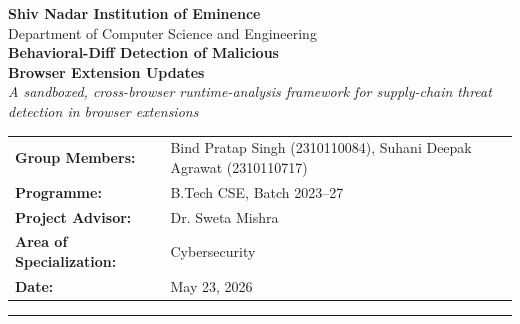 \documentclass[11pt]{article}
\begin{document}
\begin{center}
    {\large\bfseries Shiv Nadar Institution of Eminence}\\[2pt]
    {\normalsize Department of Computer Science and Engineering}\\[14pt]
    {\LARGE\bfseries\color{snublue} Behavioral-Diff Detection of Malicious\\[4pt]
     Browser Extension Updates}\\[8pt]
    {\itshape A sandboxed, cross-browser runtime-analysis framework for supply-chain
     threat detection in browser extensions}\\[14pt]
\end{center}

\begin{center}
\begin{tabular}{@{}ll@{}}
\textbf{Group Members:} & Bind Pratap Singh (2310110084), Suhani Deepak Agrawat (2310110717)\\
\textbf{Programme:}     & B.Tech CSE, Batch 2023--27\\
\textbf{Project Advisor:} & Dr. Sweta Mishra\\
\textbf{Area of Specialization:} & Cybersecurity\\
\textbf{Date:}          & May 23, 2026\\
\end{tabular}
\end{center}

\vspace{0.5em}
\hrule
\vspace{1em}
\end{document}
